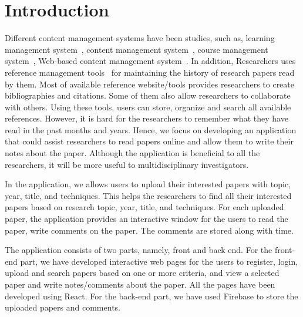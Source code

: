 
\section*{Introduction} Different content management systems have been studies, such as, learning management system~\cite{abazi2008development}, content management system~\cite{mooney2008extensible,michelinakis2004open}, course management system~\cite{brooks2006awareness}, Web-based content management system~\cite{dobecki2010web}. In addition, Researchers uses reference management tools~\cite{singh2010mendeley,eapen2006endnote,grolimund2012citation,beel2011docear} for maintaining the history of research papers read by them. Most of available reference website/tools provides researchers to create  bibliographies and citations. Some of them also allow researchers to collaborate with others. Using these tools, users can store, organize and search all available references.
 However, it is hard for the researchers to remember what they have read in the past months and years.
Hence, we focus on developing an application that could assist researchers to read papers online and allow them to write their notes about the paper. Although the application is beneficial to all the researchers, it will be more useful to multidisciplinary investigators. 

In the application, we allows users to upload their interested papers with topic, year, title, and techniques. This helps the researchers to find all their interested papers based on research topic, year, title, and techniques. For each uploaded paper, the application provides an interactive window for the users to read the paper, write comments on the paper. The comments are stored along with time. 

The application consists of two parts, namely, front and back end. For the front-end part, we have developed interactive web pages for the users to register, login, upload and search papers based on one or more criteria, and view a selected paper and write notes/comments about the paper. All the pages have been developed using React. For the back-end part, we have used Firebase to store the uploaded papers and comments. 
